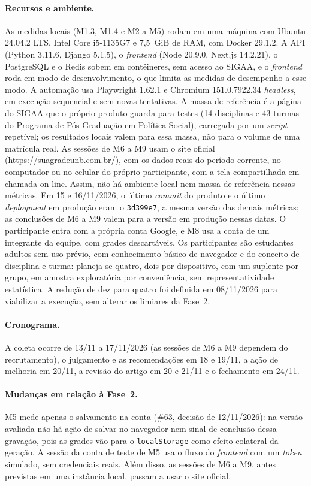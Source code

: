 \documentclass[12pt]{article}
\begin{document}
\paragraph{Recursos e ambiente.}
As medidas locais (M1.3, M1.4 e M2 a M5) rodam em uma máquina com Ubuntu 24.04.2
LTS, Intel Core i5-1135G7 e 7,5~GiB de RAM, com Docker 29.1.2. A API (Python 3.11.6,
Django 5.1.5), o \textit{frontend} (Node 20.9.0, Next.js 14.2.21), o PostgreSQL e o
Redis sobem em contêineres, sem acesso ao SIGAA, e o \textit{frontend} roda em
modo de desenvolvimento, o que limita as medidas de desempenho a esse modo. A
automação usa Playwright 1.62.1 e Chromium 151.0.7922.34 \textit{headless}, em
execução sequencial e sem novas tentativas. A massa de referência é a página do
SIGAA que o próprio produto guarda para testes (14 disciplinas e 43 turmas do
Programa de Pós-Graduação em Política Social), carregada por um \textit{script}
repetível; os resultados locais valem para essa massa, não para o volume de uma
matrícula real. As sessões de M6 a M9 usam o site oficial
(\url{https://suagradeunb.com.br/}), com os dados reais do período corrente, no
computador ou no celular do próprio participante, com a tela compartilhada em
chamada on-line. Assim, não há ambiente local nem massa de referência nessas
métricas. Em 15 e 16/11/2026, o último \textit{commit} do produto e o último
\textit{deployment} em produção eram o \texttt{3d399e7}, a mesma versão das
demais métricas; as conclusões de M6 a M9 valem para a versão em produção nessas
datas. O participante entra com a própria conta Google, e M8 usa a conta de um
integrante da equipe, com grades descartáveis.
Os participantes são estudantes adultos sem uso prévio, com conhecimento básico
de navegador e do conceito de disciplina e turma: planeja-se quatro, dois por
dispositivo, com um suplente por grupo, em amostra exploratória por
conveniência, sem representatividade estatística. A redução de dez para quatro
foi definida em 08/11/2026 para viabilizar a execução, sem alterar os limiares da
Fase~2.

\paragraph{Cronograma.}
A coleta ocorre de 13/11 a 17/11/2026 (as sessões de M6 a M9 dependem do
recrutamento), o julgamento e as recomendações em 18 e 19/11, a ação de melhoria
em 20/11, a revisão do artigo em 20 e 21/11 e o fechamento em 24/11.

\paragraph{Mudanças em relação à Fase~2.}
M5 mede apenas o salvamento na conta (\#63, decisão de 12/11/2026): na versão
avaliada não há ação de salvar no navegador nem sinal de conclusão dessa gravação,
pois as grades vão para o \texttt{localStorage} como efeito colateral da geração.
A sessão da conta de teste de M5 usa o fluxo do \textit{frontend} com um
\textit{token} simulado, sem credenciais reais. Além disso, as sessões de M6 a M9,
antes previstas em uma instância local, passam a usar o site oficial.
\end{document}
